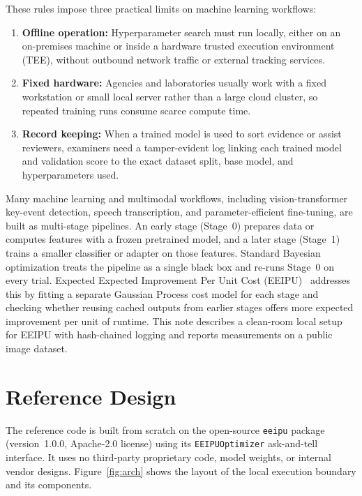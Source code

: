 \documentclass[11pt,letterpaper]{article}
\begin{document}
These rules impose three practical limits on machine learning workflows:
\begin{enumerate}
  \item \textbf{Offline operation:} Hyperparameter search must run locally, either on an on-premises machine or inside a hardware trusted execution environment (TEE), without outbound network traffic or external tracking services.
  \item \textbf{Fixed hardware:} Agencies and laboratories usually work with a fixed workstation or small local server rather than a large cloud cluster, so repeated training runs consume scarce compute time.
  \item \textbf{Record keeping:} When a trained model is used to sort evidence or assist reviewers, examiners need a tamper-evident log linking each trained model and validation score to the exact dataset split, base model, and hyperparameters used.
\end{enumerate}

Many machine learning and multimodal workflows, including vision-transformer key-event detection, speech transcription, and parameter-efficient fine-tuning, are built as multi-stage pipelines. An early stage (Stage~0) prepares data or computes features with a frozen pretrained model, and a later stage (Stage~1) trains a smaller classifier or adapter on those features. Standard Bayesian optimization treats the pipeline as a single black box and re-runs Stage~0 on every trial. Expected Expected Improvement Per Unit Cost (EEIPU)~\cite{essofi2024reducing} addresses this by fitting a separate Gaussian Process cost model for each stage and checking whether reusing cached outputs from earlier stages offers more expected improvement per unit of runtime. This note describes a clean-room local setup for EEIPU with hash-chained logging and reports measurements on a public image dataset.

\section{Reference Design}
The reference code is built from scratch on the open-source \texttt{eeipu} package (version~1.0.0, Apache-2.0 license) using its \texttt{EEIPUOptimizer} ask-and-tell interface. It uses no third-party proprietary code, model weights, or internal vendor designs. Figure~\ref{fig:arch} shows the layout of the local execution boundary and its components.
\end{document}
